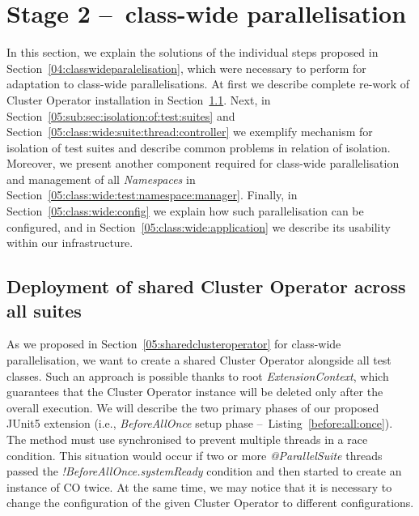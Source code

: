 \section{Stage 2 \---\ class-wide parallelisation}
\label{05:sec:class:wide:parallelism}

In this section, we explain the solutions of the individual steps proposed in Section~\ref{04:classwideparalelisation},
which were necessary to perform for adaptation to class-wide parallelisations.
At first we describe complete re-work of Cluster Operator installation in Section~\ref{05:class:wide:shared:co}.
Next, in Section~\ref{05:sub:sec:isolation:of:test:suites} and Section~\ref{05:class:wide:suite:thread:controller}
we exemplify mechanism for isolation of test suites and describe common problems in relation of isolation.
Moreover, we present another component required for class-wide parallelisation
and management of all \emph{Namespaces} in Section~\ref{05:class:wide:test:namespace:manager}.
Finally, in Section~\ref{05:class:wide:config} we explain how such parallelisation can be configured, and
in Section~\ref{05:class:wide:application} we describe its usability within our infrastructure.

\subsection{Deployment of shared Cluster Operator across all suites}
\label{05:class:wide:shared:co}

As we proposed in Section~\ref{05:sharedclusteroperator} for class-wide parallelisation,
we want to create a shared Cluster Operator alongside all test classes.
Such an approach is possible thanks to root \emph{ExtensionContext}, which guarantees that the Cluster Operator instance
will be deleted only after the overall execution. We will describe the two primary phases of our proposed JUnit5 extension
(i.e., \emph{BeforeAllOnce} setup phase \---\ Listing~\ref{before:all:once}).
The method must use synchronised to prevent multiple threads in a race condition.
This situation would occur if two or more \emph{@ParallelSuite} threads passed the \emph{!BeforeAllOnce.systemReady}
condition and then started to create an instance of CO twice.
At the same time, we may notice that it is necessary to change the configuration of the given Cluster Operator to different configurations.


